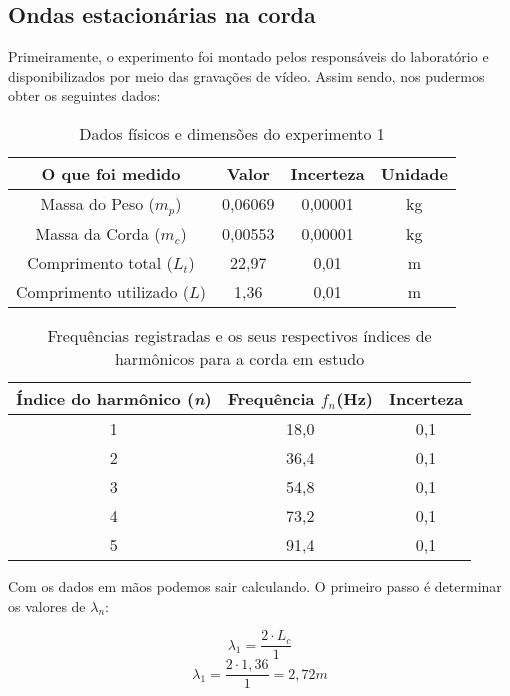 \subsection{Ondas estacionárias na corda}

Primeiramente, o experimento foi montado pelos responsáveis do laboratório e disponibilizados por meio das gravações de vídeo. Assim sendo, nos pudermos obter os seguintes dados:

\begin{table}[H]
    \centering
    \begin{tabular}{ |c||c||c||c|  }
        \hline
        \textbf{O que foi medido} & \textbf{Valor} & \textbf{Incerteza} & \textbf{Unidade}\\
        \hline 
         Massa do Peso ($m_p$)          &    0,06069    &	0,00001 & kg\\
         Massa da Corda ($m_c$)         &    0,00553    &	0,00001 & kg\\
         Comprimento total ($L_t$)      &    22,97      &	0,01 & m\\
         Comprimento utilizado ($L$)    &    1,36       &	0,01 & m\\
        \hline
    \end{tabular}
    \caption{Dados físicos e dimensões do experimento 1} 
\end{table}

\begin{table}[H]
    \centering
    \begin{tabular}{ |c||c||c|  }
        \hline
        \textbf{Índice do harmônico (\textit{n})} & \textbf{Frequência \textit{$f_n$}(Hz)} & \textbf{Incerteza}\\
        \hline 
         1 &    18,0 &	0,1\\
         2 &	36,4 &	0,1\\
         3 &	54,8 &	0,1\\
         4 &	73,2 &	0,1\\
         5 &	91,4 &	0,1\\
        \hline
    \end{tabular}
    \caption{Frequências registradas e os seus respectivos índices de harmônicos para a corda em estudo} 
\end{table}

Com os dados em mãos podemos sair calculando. O primeiro passo é determinar os valores de $\lambda_n$:

\[ \lambda_1 = \frac{2 \cdot L_c}{1} \]
\[ \lambda_1 = \frac{2 \cdot 1,36}{1} = 2,72 m \]

